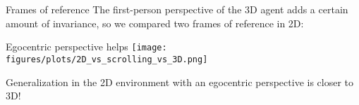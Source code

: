\documentclass{beamer}
\begin{document}
\begin{frame}{Frames of reference}
The first-person perspective of the 3D agent adds a certain amount of invariance, so we compared two frames of reference in 2D:
\end{frame}

\begin{frame}{Egocentric perspective helps}
\vspace{1em}
\centering
\texttt{[image: figures/plots/2D\_vs\_scrolling\_vs\_3D.png]}
\end{frame}

\begin{frame}[standout]
Generalization in the 2D environment with an egocentric perspective is closer to 3D!
\end{frame}

\end{document}
